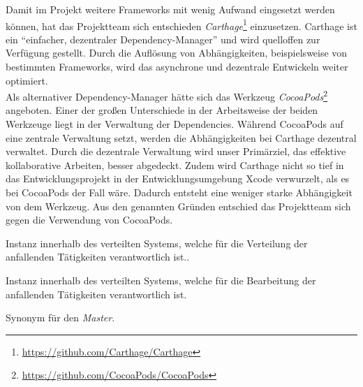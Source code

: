 Damit im Projekt weitere Frameworks mit wenig Aufwand eingesetzt werden können, hat das Projektteam sich entschieden \emph{Carthage}\footnote{\url{https://github.com/Carthage/Carthage}} einzusetzen. Carthage ist ein \enquote{einfacher, dezentraler Dependency-Manager} und wird quelloffen zur Verfügung gestellt. Durch die Auflösung von Abhängigkeiten, beispielsweise von bestimmten Frameworks, wird das asynchrone und dezentrale Entwickeln weiter optimiert. \\
Als alternativer Dependency-Manager hätte sich das Werkzeug \emph{CocoaPods}\footnote{\url{https://github.com/CocoaPods/CocoaPods}} angeboten. Einer der großen Unterschiede in der Arbeitsweise der beiden Werkzeuge liegt in der Verwaltung der Dependencies. Während CocoaPods auf eine zentrale Verwaltung setzt, werden die Abhängigkeiten bei Carthage dezentral verwaltet. Durch die dezentrale Verwaltung wird unser Primärziel, das effektive kollaborative Arbeiten, besser abgedeckt. Zudem wird Carthage nicht so tief in das Entwicklungsprojekt in der Entwicklungsumgebung Xcode verwurzelt, als es bei CocoaPods der Fall wäre. Dadurch entsteht eine weniger starke Abhängigkeit von dem Werkzeug. Aus den genannten Gründen entschied das Projektteam sich gegen die Verwendung von CocoaPods. 


Instanz innerhalb des verteilten Systems, welche für die Verteilung der anfallenden Tätigkeiten verantwortlich ist.{.\vspace{4mm}}

Instanz innerhalb des verteilten Systems, welche für die Bearbeitung der anfallenden Tätigkeiten verantwortlich ist.

Synonym für den \emph{Master}.


